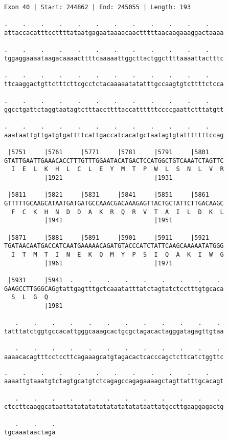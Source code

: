 \documentclass{article}
\begin{document}
\newpage
\begin{Verbatim}[fontfamily=courier]
Exon 40 | Start: 244862 | End: 245055 | Length: 193

.    .    .    .    .    .    .    .    .    .    .    .    
attaccacatttccttttataatgagaataaaacaactttttaacaagaaaggactaaaa

.    .    .    .    .    .    .    .    .    .    .    .    
tggaggaaaataagacaaaacttttcaaaaattggcttactggcttttaaaattactttc

.    .    .    .    .    .    .    .    .    .    .    .    
ttcaaggactgttctttcttcgcctctacaaaaatatatttgccaagtgtcttttctcca

.    .    .    .    .    .    .    .    .    .    .    .    
ggcctgattctaggtaatagtctttaccttttaccattttttccccgaattctttatgtt

.    .    .    .    .    .    .    .    .    .    .    .    
aaataattgttgatgtgattttcattgaccatcacatgctaatagtgtatttttttccag

 |5751     |5761     |5771     |5781     |5791     |5801    
GTATTGAATTGAAACACCTTTGTTTGGAATACATGACTCCATGGCTGTCAAATCTAGTTC
  I  E  L  K  H  L  C  L  E  Y  M  T  P  W  L  S  N  L  V  R
           |1921                         |1931              

 |5811     |5821     |5831     |5841     |5851     |5861    
GTTTTTGCAAGCATAATGATGATGCCAAACGACAAAGAGTTACTGCTATTCTTGACAAGC
  F  C  K  H  N  D  D  A  K  R  Q  R  V  T  A  I  L  D  K  L
           |1941                         |1951              

 |5871     |5881     |5891     |5901     |5911     |5921    
TGATAACAATGACCATCAATGAAAAACAGATGTACCCATCTATTCAAGCAAAAATATGGG
  I  T  M  T  I  N  E  K  Q  M  Y  P  S  I  Q  A  K  I  W  G
           |1961                         |1971              

 |5931     |5941  .    .    .    .    .    .    .    .    . 
GAAGCCTTGGGCAGgtattgagtttgctcaaatatttatctagtatctcctttgtgcaca
  S  L  G  Q                                                
           |1981                                            

   .    .    .    .    .    .    .    .    .    .    .    . 
tatttatctggtgccacattgggcaaagcactgcgctagacactagggatagagttgtaa

   .    .    .    .    .    .    .    .    .    .    .    . 
aaaacacagtttcctccttcagaaagcatgtagacactcacccagctcttcatctggttc

\end{Verbatim}
\newpage
\begin{Verbatim}[fontfamily=courier]
   .    .    .    .    .    .    .    .    .    .    .    . 
aaaattgtaaatgtctagtgcatgtctcagagccagagaaaagctagttatttgcacagt

   .    .    .    .    .    .    .    .    .    .    .    . 
ctccttcaaggcataattatatatatatatatatatataattatgccttgaaggagactg

   .    .    .
tgcaaataactaga
\end{Verbatim}
\end{document}
